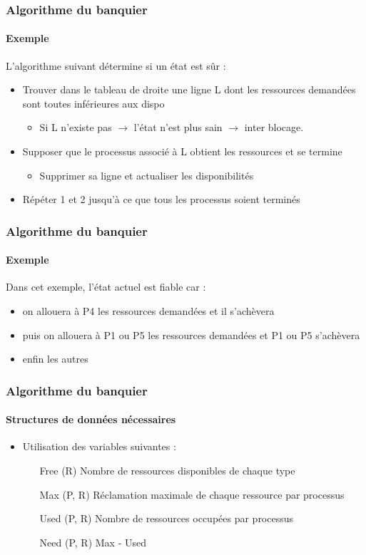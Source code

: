 \begin{frame}
\frametitle{Algorithme du banquier}
\framesubtitle{Exemple}
L'algorithme suivant détermine si un état est sûr :
\begin{itemize}
\item <1->Trouver dans le tableau de droite une ligne L dont les ressources demandées sont toutes inférieures aux dispo
\begin{itemize}
\item Si L n'existe pas $\rightarrow$ l'état n'est plus sain $\rightarrow$ inter blocage.
\end{itemize}

\item <2->Supposer que le processus associé à L obtient les ressources et se termine
\begin{itemize}
\item Supprimer sa ligne et actualiser les disponibilités
\end{itemize}

\item <3->Répéter 1 et 2 jusqu'à ce que tous les processus soient terminés
\end{itemize}
\end{frame}

\begin{frame}
\frametitle{Algorithme du banquier}
\framesubtitle{Exemple}
Dans cet exemple, l'état actuel est fiable car :
\begin{itemize}
\item on allouera à P4 les ressources demandées et il s'achèvera
\item puis on allouera à P1 ou P5 les ressources demandées et P1 ou P5 s'achèvera
\item enfin les autres
\end{itemize}
\end{frame}

\begin{frame}
\frametitle{Algorithme du banquier}
\framesubtitle{Structures de données nécessaires}
\begin{itemize}
\item Utilisation des variables suivantes :
\begin{itemize}
\item [Free (R)] Nombre de ressources disponibles de chaque type
\item [Max (P, R)] Réclamation maximale de chaque ressource par processus
\item [Used (P, R)] Nombre de ressources occupées par processus
\item [Need (P, R)] Max - Used
\end{itemize}
\end{itemize}
\end{frame}

